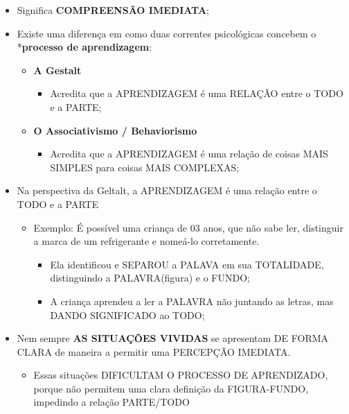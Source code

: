 \documentclass[
]{book}
\providecommand{\tightlist}{%
  \setlength{\itemsep}{0pt}\setlength{\parskip}{0pt}}
\begin{document}
\begin{itemize}
\tightlist
\item
  Significa \textbf{COMPREENSÃO IMEDIATA};
\item
  Existe uma diferença em como duas correntes psicológicas concebem o
  *\textbf{processo de aprendizagem}:

  \begin{itemize}
  \tightlist
  \item
    \textbf{A Gestalt}

    \begin{itemize}
    \tightlist
    \item
      Acredita que a APRENDIZAGEM é uma RELAÇÃO entre o TODO e a
      PARTE;
    \end{itemize}
  \item
    \textbf{O Associativismo / Behaviorismo}

    \begin{itemize}
    \tightlist
    \item
      Acredita que a APRENDIZAGEM é uma relação de coisas MAIS
      SIMPLES para coisas MAIS COMPLEXAS;
    \end{itemize}
  \end{itemize}
\item
  Na perspectiva da Geltalt, a APRENDIZAGEM é uma relação entre o TODO
  e a PARTE

  \begin{itemize}
  \tightlist
  \item
    Exemplo: É possível uma criança de 03 anos, que não sabe ler,
    distinguir a marca de um refrigerante e nomeá-lo corretamente.

    \begin{itemize}
    \tightlist
    \item
      Ela identificou e SEPAROU a PALAVA em sua TOTALIDADE,
      distinguindo a PALAVRA(figura) e o FUNDO;
    \item
      A criança aprendeu a ler a PALAVRA não juntando as letras,
      mas DANDO SIGNIFICADO ao TODO;
    \end{itemize}
  \end{itemize}
\item
  Nem sempre \textbf{AS SITUAÇÕES VIVIDAS} se apresentam DE FORMA CLARA de
  maneira a permitir uma PERCEPÇÃO IMEDIATA.

  \begin{itemize}
  \tightlist
  \item
    Essas situações DIFICULTAM O PROCESSO DE APRENDIZADO, porque não
    permitem uma clara definição da FIGURA-FUNDO, impedindo a
    relação PARTE/TODO
  \end{itemize}
\end{itemize}
\end{document}
